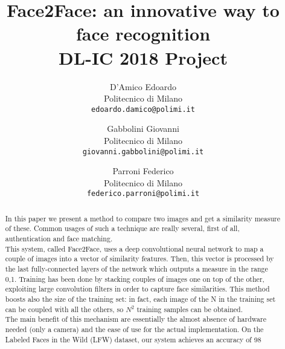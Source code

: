 \documentclass[10pt,twocolumn,letterpaper]{article}
\begin{document}
\title{Face2Face: an innovative way to face recognition \\ DL-IC 2018 Project} 

\author{D'Amico Edoardo\\
Politecnico di Milano\\
{\tt\small edoardo.damico@polimi.it}
\and
Gabbolini Giovanni\\
Politecnico di Milano\\
{\tt\small giovanni.gabbolini@polimi.it}
\and
Parroni Federico\\
Politecnico di Milano\\
{\tt\small federico.parroni@polimi.it}
}

\maketitle

\begin{abstract}
In this paper we present a method to compare two images and get a similarity measure of these. Common usages of such a technique are really several, first of all, authentication and face matching.
\\
This system, called Face2Face, uses a deep convolutional neural network to map a couple of images into a vector of similarity features. Then, this vector is processed by the last fully-connected layers of the network which outputs a measure in the range 0,1. Training has been done by stacking couples of images one on top of the other, exploiting large convolution filters in order to capture face similarities. This method boosts also the size of the training set: in fact, each image of the N in the training set can be coupled with all the others, so $N^2$ training samples can be obtained.
\\
The main benefit of this mechanism are essentially the almost absence of hardware needed (only a camera) and the ease of use for the actual implementation. 
On the Labeled Faces in the Wild (LFW) dataset, our system achieves an accuracy of 98%
\end{abstract}

\end{document}
